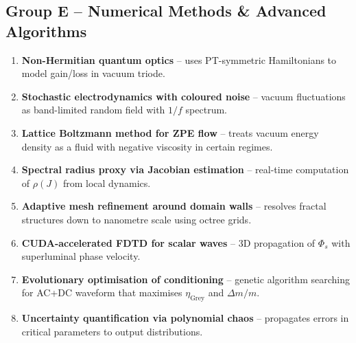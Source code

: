 \documentclass[11pt]{article}
\begin{document}
\subsection{Group E -- Numerical Methods \& Advanced Algorithms}
\begin{enumerate}[nosep,start=33]
    \item \textbf{Non-Hermitian quantum optics} -- uses PT-symmetric Hamiltonians to model gain/loss in vacuum triode.
    \item \textbf{Stochastic electrodynamics with coloured noise} -- vacuum fluctuations as band-limited random field with $1/f$ spectrum.
    \item \textbf{Lattice Boltzmann method for ZPE flow} -- treats vacuum energy density as a fluid with negative viscosity in certain regimes.
    \item \textbf{Spectral radius proxy via Jacobian estimation} -- real-time computation of $\rho(J)$ from local dynamics.
    \item \textbf{Adaptive mesh refinement around domain walls} -- resolves fractal structures down to nanometre scale using octree grids.
    \item \textbf{CUDA-accelerated FDTD for scalar waves} -- 3D propagation of $\Phi_s$ with superluminal phase velocity.
    \item \textbf{Evolutionary optimisation of conditioning} -- genetic algorithm searching for AC+DC waveform that maximises $\eta_{\text{Grey}}$ and $\Delta m/m$.
    \item \textbf{Uncertainty quantification via polynomial chaos} -- propagates errors in critical parameters to output distributions.
\end{enumerate}
\end{document}
